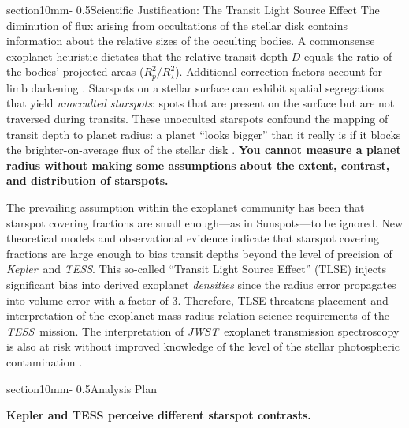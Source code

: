 \documentclass[letterpaper,11pt]{article}
\makeatletter
\renewcommand{\section}{\@startsection%
{section}{1}{0mm}{-\baselineskip}%
{0.5\baselineskip}{\normalfont\Large\bfseries}}%
\newcommand{\tess}{{\it TESS}}
\newcommand{\jwst}{{\it JWST}}
\newcommand{\kepler}{{\it Kepler}}
\makeatother
\begin{document}
\section{Scientific Justification: The Transit Light Source Effect}
The diminution of flux arising from occultations of the stellar disk contains information about the relative sizes of the occulting bodies.  A commonsense exoplanet heuristic dictates that the relative transit depth $D$ equals the ratio of the bodies' projected areas ($R_p^2/R_\star^2$).  Additional correction factors account for limb darkening \citep{2002ApJ...580L.171M}.  Starspots on a stellar surface can exhibit spatial segregations
that yield \emph{unocculted starspots}: spots that are present on the surface but are not traversed during transits.  These unocculted starspots confound the mapping of transit depth to planet radius: a planet ``looks bigger'' than it really is if it blocks the brighter-on-average flux of the stellar disk \citep{2018AJ....156...91M}.  \textbf{You cannot measure a planet radius without making some assumptions about the extent, contrast, and distribution of starspots.}

The prevailing assumption within the exoplanet community has been that starspot covering fractions are small enough---as in Sunspots---to be ignored.  New theoretical models \citep{2018ApJ...853..122R} and observational evidence \citep{2016MNRAS.463.2494F} indicate that starspot covering fractions are large enough to bias transit depths beyond the level of precision of \kepler\ and \tess.  This so-called ``Transit Light Source Effect'' (TLSE) injects significant bias into derived exoplanet \emph{densities} since the radius error propagates into volume error with a factor of 3.  Therefore, TLSE threatens placement and interpretation of the exoplanet mass-radius relation science requirements of the \tess\ mission.  The interpretation of \jwst\ exoplanet transmission spectroscopy is also at risk without improved knowledge of the level of the stellar photospheric contamination \citep{2019AJ....157...11W}.

\section{Analysis Plan}

\textbf{Kepler and TESS perceive different starspot contrasts.}
\end{document}
